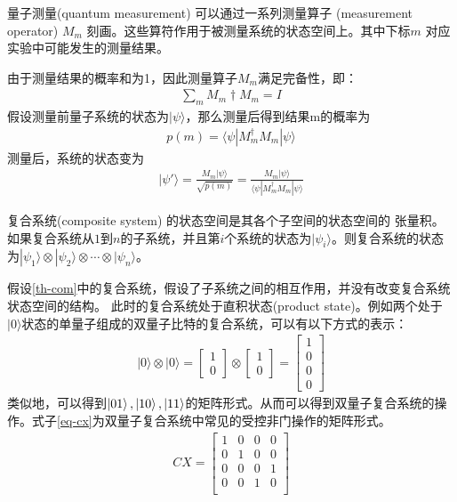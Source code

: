 \begin{theorem}\citep{nielsen2010quantum}
    \label{th-measurement}
    量子测量(quantum measurement) 可以通过一系列测量算子 (measurement operator) ${M_m}$ 刻画。这些算符作用于被测量系统的状态空间上。其中下标$m$
   对应实验中可能发生的测量结果。
\end{theorem}
由于测量结果的概率和为1，因此测量算子${M_m}$满足完备性，即：
\begin{align}
    \sum_m M_m\dagger M_m = I
\end{align}
假设测量前量子系统的状态为\(|\psi\rangle\)，那么测量后得到结果m的概率为
\begin{align}
    p(m) = \langle\psi|M_m^\dagger M_m|\psi\rangle
\end{align}
测量后，系统的状态变为
\begin{align}
    |\psi'\rangle =  \frac{M_m|\psi\rangle}{\sqrt{p(m)}} = \frac{M_m|\psi\rangle}{\langle\psi|M_m^\dagger M_m|\psi\rangle}
\end{align}
\begin{theorem}\citep{nielsen2010quantum}
    复合系统(composite system) 的状态空间是其各个子空间的状态空间的
    张量积。如果复合系统从$1$到$n$的子系统，并且第$i$个系统的状态为$|\psi_i\rangle$。则复合系统的状态为\(|\psi_1\rangle\otimes|\psi_2\rangle\otimes\cdots\otimes |\psi_n\rangle\)。
    \label{th-com}
\end{theorem}
假设\ref{th-com}中的复合系统，假设了子系统之间的相互作用，并没有改变复合系统状态空间的结构。
此时的复合系统处于直积状态(product state)。例如两个处于\(|0\rangle\)状态的单量子组成的双量子比特的复合系统，可以有以下方式的表示：
\begin{align}
    |0\rangle\otimes|0\rangle=\left[\begin{matrix}
        1\\0
    \end{matrix}\right]\otimes\left[\begin{matrix}
        1\\0
    \end{matrix}\right] = \left[\begin{matrix}
        1\\0\\0\\0
    \end{matrix}\right]
\end{align}
类似地，可以得到\(\ket{01},\ket{10},\ket{11}\)的矩阵形式。从而可以得到双量子复合系统的操作。式子\ref{eq-cx}为双量子复合系统中常见的受控非门操作的矩阵形式。
\begin{align}
    \label{eq-cx}
    CX=\left[\begin{matrix}
        1 & 0 & 0 & 0\\
        0 & 1 & 0 & 0\\
        0 & 0 & 0 & 1\\
        0 & 0 & 1 & 0\\
    \end{matrix}\right]
\end{align}


